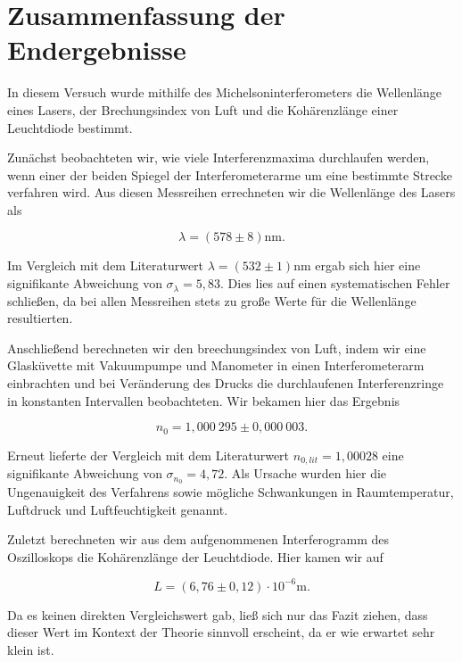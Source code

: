 \documentclass{article}
\begin{document}
\section{Zusammenfassung der Endergebnisse}

In diesem Versuch wurde mithilfe des Michelsoninterferometers die Wellenlänge eines Lasers, der Brechungsindex von Luft und die Kohärenzlänge einer Leuchtdiode bestimmt.

Zunächst beobachteten wir, wie viele Interferenzmaxima durchlaufen werden, wenn einer der beiden Spiegel der Interferometerarme um eine bestimmte Strecke verfahren wird. Aus diesen Messreihen errechneten wir die Wellenlänge des Lasers als 

\begin{equation}
    \lambda = (578 \pm 8) \text{nm}.
\end{equation}

Im Vergleich mit dem Literaturwert $\lambda = (532 \pm 1)$nm ergab sich hier eine signifikante Abweichung von $\sigma_\lambda = 5,83$. Dies lies auf einen systematischen Fehler schließen, da bei allen Messreihen stets zu große Werte für die Wellenlänge resultierten.

Anschließend berechneten wir den breechungsindex von Luft, indem wir eine Glasküvette mit Vakuumpumpe und Manometer in einen Interferometerarm einbrachten und bei Veränderung des Drucks die durchlaufenen Interferenzringe in konstanten Intervallen beobachteten. Wir bekamen hier das Ergebnis

\begin{equation}
    n_0 = 1,000 \ 295 \pm 0,000 \ 003.
\end{equation}

Erneut lieferte der Vergleich mit dem Literaturwert $n_{0,lit} = 1,00028$ eine signifikante Abweichung von $\sigma_{n_0} = 4,72$. Als Ursache wurden hier die Ungenauigkeit des Verfahrens sowie mögliche Schwankungen in Raumtemperatur, Luftdruck und Luftfeuchtigkeit genannt.

Zuletzt berechneten wir aus dem aufgenommenen Interferogramm des Oszilloskops die Kohärenzlänge der Leuchtdiode. Hier kamen wir auf 

\begin{equation}
    L = (6,76 \pm 0,12) \cdot 10^{-6} \text{m}.
\end{equation}

Da es keinen direkten Vergleichswert gab, ließ sich nur das Fazit ziehen, dass dieser Wert im Kontext der Theorie sinnvoll erscheint, da er wie erwartet sehr klein ist. 
\end{document}
